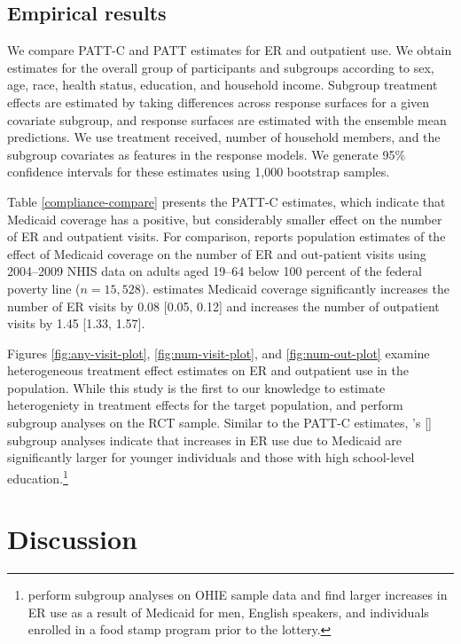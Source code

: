 \documentclass[hidelinks,12pt]{article}
\newcommand{\possessivecite}[1]{\citeauthor{#1}'s [\citeyear{#1}]}
\begin{document}
\subsection{Empirical results}\label{results}

We compare PATT-C and PATT estimates for ER and outpatient use. We obtain estimates for the overall group of participants and subgroups according to sex, age, race, health status, education, and household income. Subgroup treatment effects are estimated by taking differences across response surfaces for a given covariate subgroup, and response surfaces are estimated with the ensemble mean predictions. We use treatment received, number of household members, and the subgroup covariates as features in the response models. We generate 95\% confidence intervals for these estimates using 1,000 bootstrap samples. 

Table \ref{compliance-compare} presents the PATT-C estimates, which indicate that Medicaid coverage has a positive, but considerably smaller effect on the number of ER and outpatient visits. For comparison, \citet{finkelstein2012} reports population estimates of the effect of Medicaid coverage on the number of ER and out-patient visits using 2004--2009 NHIS data on adults aged 19--64 below 100 percent of the federal poverty line ($n=15,528$). \citet{finkelstein2012} estimates Medicaid coverage significantly increases the number of ER visits by 0.08 [0.05, 0.12] and increases the number of outpatient visits by 1.45 [1.33, 1.57]. 

Figures \ref{fig:any-visit-plot}, \ref{fig:num-visit-plot}, and \ref{fig:num-out-plot} examine heterogeneous treatment effect estimates on ER and outpatient use in the population. While this study is the first to our knowledge to estimate heterogeniety in treatment effects for the target population, \citet{Taubman} and \citet{NBERw22363} perform subgroup analyses on the RCT sample. Similar to the PATT-C estimates, \possessivecite{Taubman} subgroup analyses indicate that increases in ER use due to Medicaid are significantly larger for younger individuals and those with high school-level education.\footnote{\citet{NBERw22363} perform subgroup analyses on OHIE sample data and find larger increases in ER use as a result of Medicaid for men, English speakers, and individuals enrolled in a food stamp program prior to the lottery.}

\section{Discussion} \label{discussion}
\end{document}
